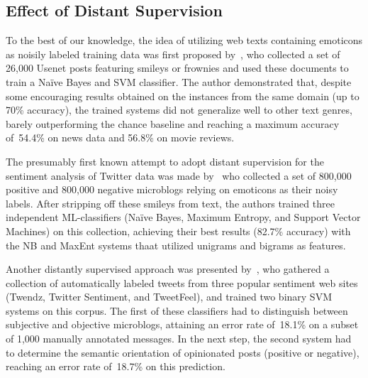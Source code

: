 
\subsection{Effect of Distant Supervision}
\todo[inline]{}

To the best of our knowledge, the idea of utilizing web texts
containing emoticons as noisily labeled training data was first
proposed by~\citet{Read:05}, who collected a set of 26,000 Usenet
posts featuring smileys or frownies and used these documents to train
a Na{\"i}ve Bayes and SVM classifier.  The author demonstrated that,
despite some encouraging results obtained on the instances from the
same domain (up to 70\% accuracy), the trained systems did not
generalize well to other text genres, barely outperforming the chance
baseline and reaching a maximum accuracy of~54.4\% on news data and
56.8\% on movie reviews.

The presumably first known attempt to adopt distant supervision for
the sentiment analysis of Twitter data was made by~\citet{Go:09} who
collected a set of 800,000 positive and 800,000 negative microblogs
relying on emoticons as their noisy labels.  After stripping off these
smileys from text, the authors trained three independent
ML-classifiers (Na{\"i}ve Bayes, Maximum Entropy, and Support Vector
Machines) on this collection, achieving their best results (82.7\%
accuracy) with the NB and MaxEnt systems thaat utilized unigrams and
bigrams as features.

Another distantly supervised approach was presented
by~\citet{Barbosa:10}, who gathered a collection of automatically
labeled tweets from three popular sentiment web sites (Twendz, Twitter
Sentiment, and TweetFeel), and trained two binary SVM systems on this
corpus.  The first of these classifiers had to distinguish between
subjective and objective microblogs, attaining an error rate of~18.1\%
on a subset of 1,000 manually annotated messages.  In the next step,
the second system had to determine the semantic orientation of
opinionated posts (positive or negative), reaching an error rate
of~18.7\% on this prediction.


